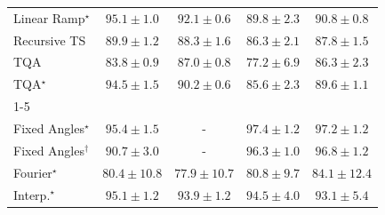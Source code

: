 \begin{tabular}{l|cccc|}
Linear Ramp$^\star$ & {\cellcolor[HTML]{00532F}} \color[HTML]{F1F1F1} $95.1\pm 1.0$ & {\cellcolor[HTML]{006636}} \color[HTML]{F1F1F1} $92.1\pm 0.6$ & {\cellcolor[HTML]{0C723B}} \color[HTML]{F1F1F1} $89.8\pm 2.3$ & {\cellcolor[HTML]{066D39}} \color[HTML]{F1F1F1} $90.8\pm 0.8$ \\
Recursive TS & {\cellcolor[HTML]{0B713B}} \color[HTML]{F1F1F1} $89.9\pm 1.2$ & {\cellcolor[HTML]{15793E}} \color[HTML]{F1F1F1} $88.3\pm 1.6$ & {\cellcolor[HTML]{228343}} \color[HTML]{F1F1F1} $86.3\pm 2.1$ & {\cellcolor[HTML]{187B3F}} \color[HTML]{F1F1F1} $87.8\pm 1.5$ \\
TQA & {\cellcolor[HTML]{2F944E}} \color[HTML]{F1F1F1} $83.8\pm 0.9$ & {\cellcolor[HTML]{1E8041}} \color[HTML]{F1F1F1} $87.0\pm 0.8$ & {\cellcolor[HTML]{61BB6D}} \color[HTML]{F1F1F1} $77.2\pm 6.9$ & {\cellcolor[HTML]{228343}} \color[HTML]{F1F1F1} $86.3\pm 2.3$ \\
TQA$^\star$ & {\cellcolor[HTML]{005730}} \color[HTML]{F1F1F1} $94.5\pm 1.5$ & {\cellcolor[HTML]{096F3A}} \color[HTML]{F1F1F1} $90.2\pm 0.6$ & {\cellcolor[HTML]{258745}} \color[HTML]{F1F1F1} $85.6\pm 2.3$ & {\cellcolor[HTML]{0D733C}} \color[HTML]{F1F1F1} $89.6\pm 1.1$ \\
\cline{1-5}
\multicolumn{5}{c}{\rule{0pt}{8pt}SV} \\
\midrule
Fixed Angles$^\star$ & {\cellcolor[HTML]{03446A}} \color[HTML]{F1F1F1} $95.4\pm 1.5$ & {\cellcolor[HTML]{000000}} \color[HTML]{F1F1F1} {\cellcolor{white}} \color{black} - & {\cellcolor[HTML]{023858}} \color[HTML]{F1F1F1} $97.4\pm 1.2$ & {\cellcolor[HTML]{02395A}} \color[HTML]{F1F1F1} $97.2\pm 1.2$ \\
Fixed Angles$^\dagger$ & {\cellcolor[HTML]{045E94}} \color[HTML]{F1F1F1} $90.7\pm 3.0$ & {\cellcolor[HTML]{000000}} \color[HTML]{F1F1F1} {\cellcolor{white}} \color{black} - & {\cellcolor[HTML]{023E62}} \color[HTML]{F1F1F1} $96.3\pm 1.0$ & {\cellcolor[HTML]{023B5D}} \color[HTML]{F1F1F1} $96.8\pm 1.2$ \\
Fourier$^\star$ & {\cellcolor[HTML]{3790C0}} \color[HTML]{F1F1F1} $80.4\pm 10.8$ & {\cellcolor[HTML]{529BC7}} \color[HTML]{F1F1F1} $77.9\pm 10.7$ & {\cellcolor[HTML]{348EBF}} \color[HTML]{F1F1F1} $80.8\pm 9.7$ & {\cellcolor[HTML]{167BB6}} \color[HTML]{F1F1F1} $84.1\pm 12.4$ \\
Interp.$^\star$ & {\cellcolor[HTML]{03466E}} \color[HTML]{F1F1F1} $95.1\pm 1.2$ & {\cellcolor[HTML]{034C78}} \color[HTML]{F1F1F1} $93.9\pm 1.2$ & {\cellcolor[HTML]{034973}} \color[HTML]{F1F1F1} $94.5\pm 4.0$ & {\cellcolor[HTML]{045280}} \color[HTML]{F1F1F1} $93.1\pm 5.4$ \\

\end{tabular}

